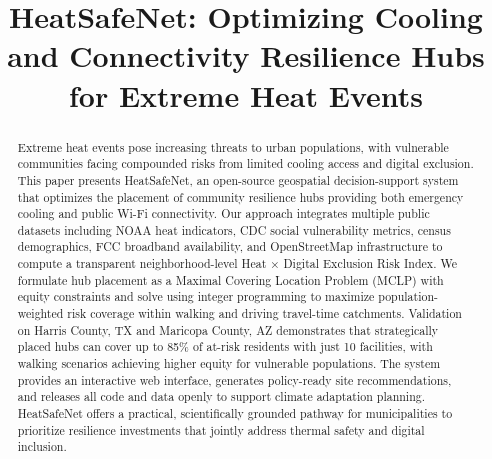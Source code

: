 \documentclass[conference]{IEEEtran}
\begin{document}
\title{HeatSafeNet: Optimizing Cooling and Connectivity Resilience Hubs for Extreme Heat Events}

\author{
\and
{}
}

\maketitle

\begin{abstract}
Extreme heat events pose increasing threats to urban populations, with vulnerable communities facing compounded risks from limited cooling access and digital exclusion. This paper presents HeatSafeNet, an open-source geospatial decision-support system that optimizes the placement of community resilience hubs providing both emergency cooling and public Wi-Fi connectivity. Our approach integrates multiple public datasets including NOAA heat indicators, CDC social vulnerability metrics, census demographics, FCC broadband availability, and OpenStreetMap infrastructure to compute a transparent neighborhood-level Heat × Digital Exclusion Risk Index. We formulate hub placement as a Maximal Covering Location Problem (MCLP) with equity constraints and solve using integer programming to maximize population-weighted risk coverage within walking and driving travel-time catchments. Validation on Harris County, TX and Maricopa County, AZ demonstrates that strategically placed hubs can cover up to 85\% of at-risk residents with just 10 facilities, with walking scenarios achieving higher equity for vulnerable populations. The system provides an interactive web interface, generates policy-ready site recommendations, and releases all code and data openly to support climate adaptation planning. HeatSafeNet offers a practical, scientifically grounded pathway for municipalities to prioritize resilience investments that jointly address thermal safety and digital inclusion.
\end{abstract}
\end{document}
